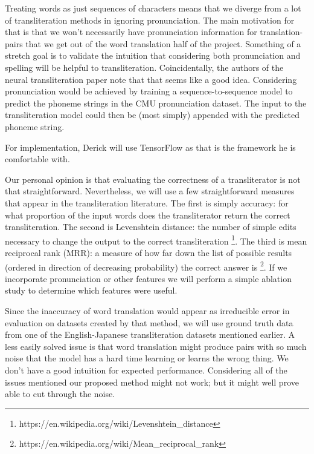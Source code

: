 \documentclass{article}
\begin{document}
Treating words as just sequences of characters
means that we diverge from a lot of transliteration methods
in ignoring pronunciation.
The main motivation for that
is that we won't necessarily have pronunciation information for translation-pairs
that we get out of the word translation half of the project.
Something of a stretch goal is to validate the intuition
that considering both pronunciation and spelling will be helpful to transliteration.
Coincidentally,
the authors of the neural transliteration paper \cite{Rosca2016SequencetosequenceNN}
note that that seems like a good idea.
Considering pronunciation would be achieved by
training a sequence-to-sequence model to predict
the phoneme strings in the CMU pronunciation dataset.
The input to the transliteration model could then be
(most simply) appended with the predicted phoneme string.

For implementation,
Derick will use TensorFlow as that is the framework he is comfortable with.

Our personal opinion is that evaluating the correctness
of a transliterator is not that straightforward.
Nevertheless,
we will use a few straightforward measures
that appear in the transliteration literature.
The first is simply accuracy:
for what proportion of the input words
does the transliterator return the correct transliteration.
The second is Levenshtein distance:
the number of simple edits necessary to change the output to
the correct transliteration
\footnote{https://en.wikipedia.org/wiki/Levenshtein\_distance}.
The third is mean reciprocal rank (MRR):
a measure of how far down the list of possible results
(ordered in direction of decreasing probability)
the correct answer is
\footnote{https://en.wikipedia.org/wiki/Mean\_reciprocal\_rank}.
If we incorporate pronunciation or other features
we will perform a simple ablation study
to determine which features were useful.

Since the inaccuracy of word translation would appear as irreducible error
in evaluation on datasets created by that method,
we will use ground truth data
from one of the English-Japanese transliteration datasets mentioned earlier.
A less easily solved issue is that
word translation might produce pairs with so much noise
that the model has a hard time learning or learns the wrong thing.
We don't have a good intuition for expected performance.
Considering all of the issues mentioned our proposed method might not work;
but it might well prove able to cut through the noise.
\end{document}
